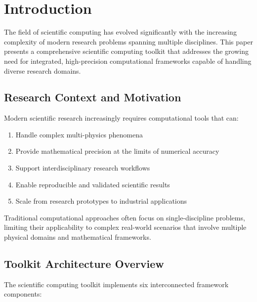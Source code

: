 \documentclass[11pt,a4paper]{article}
\begin{document}
\tableofcontents
\newpage

\listoffigures
\listoftables
\newpage

\section{Introduction}
\label{sec:introduction}

The field of scientific computing has evolved significantly with the increasing complexity of modern research problems spanning multiple disciplines. This paper presents a comprehensive scientific computing toolkit that addresses the growing need for integrated, high-precision computational frameworks capable of handling diverse research domains.

\subsection{Research Context and Motivation}
\label{subsec:context}

Modern scientific research increasingly requires computational tools that can:
\begin{enumerate}
    \item Handle complex multi-physics phenomena
    \item Provide mathematical precision at the limits of numerical accuracy
    \item Support interdisciplinary research workflows
    \item Enable reproducible and validated scientific results
    \item Scale from research prototypes to industrial applications
\end{enumerate}

Traditional computational approaches often focus on single-discipline problems, limiting their applicability to complex real-world scenarios that involve multiple physical domains and mathematical frameworks.

\subsection{Toolkit Architecture Overview}
\label{subsec:architecture}

The scientific computing toolkit implements six interconnected framework components:
\end{document}
